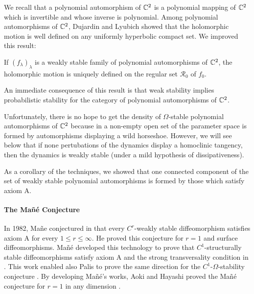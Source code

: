 \documentclass[11pt,openany,leqno]{article}
\begin{document}
We recall that a polynomial automorphism of $\mathbb C^2$ is a polynomial mapping of $\mathbb C^2$ which is invertible and whose inverse is polynomial. Among polynomial automorphisms of $\mathbb C^2$, Dujardin and Lyubich \cite{LD13} showed that the holomorphic motion is well defined on any uniformly hyperbolic compact set. We improved this result:
\begin{lemm}\label{lambdalemC2}
If $(f_\lambda)_\lambda$ is a weakly stable family of polynomial automorphisms of $\mathbb C^2$,  the holomorphic motion is uniquely defined on the regular set $\mathcal R_0$ of $f_0$.
\end{lemm}
An immediate consequence of this result is that weak stability implies 
probabilistic stability for the category of polynomial automorphisms of $\mathbb C^2$. 

Unfortunately, there is no hope to get the density of $\Omega$-stable polynomial automorphisms of $\mathbb C^2$  because  in a non-empty open set \cite{Bu97} of the parameter space is formed by automorphisms displaying a wild horseshoe. However, we will see below that if none pertubations of the dynamics display a homoclinic  tangency, then the dynamics is weakly stable (under a mild hypothesis of dissipativeness). 
 
%


As a corollary of the techniques, we showed that one connected component of the set of weakly stable polynomial automorphisms is formed by  those which satisfy axiom A.   
%


\paragraph{The Ma\~n\'e  Conjecture}
In 1982, Ma\~ne conjectured in \cite{Ma82} that every $C^r$-weakly stable diffeomorphism satisfies axiom A for every $1\le r\le \infty$. He proved this conjecture for $r=1$ and surface diffeomorphisms.  Ma\~ n\'e developed this technology to prove that $C^1$-structurally stable diffeomorphisms satisfy  axiom A and the strong transversality condition in \cite{Ma88}. This work enabled also Palis to prove the same direction for the $C^1$-$\Omega$-stability conjecture \cite{Pa88}.
By developing Ma\~n\'e's works, Aoki and Hayashi proved the Ma\~n\'e conjecture for $r=1$ in any dimension \cite{Ao92,Ha92}.
 
\end{document}
